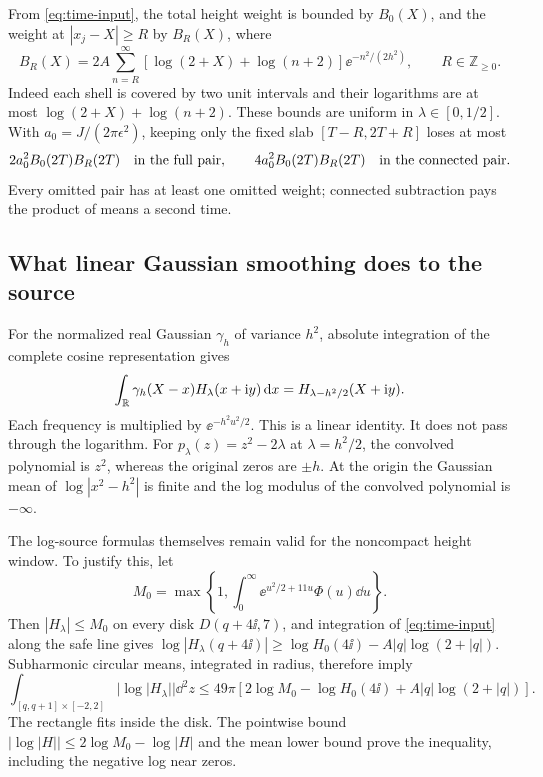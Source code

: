 From \eqref{eq:time-input}, the total height weight is bounded by
$B_0(X)$, and the weight at $|x_j-X|\ge R$ by $B_R(X)$, where
\begin{equation}\label{eq:gaussian-weight-tail}
 B_R(X)=2A\sum_{n=R}^\infty
       [\log(2+X)+\log(n+2)]\ee^{-n^2/(2h^2)},\qquad R\in\mathbb Z_{\ge0}.
\end{equation}
Indeed each shell is covered by two unit intervals and their logarithms
are at most $\log(2+X)+\log(n+2)$. These bounds are uniform in
$\lambda\in[0,1/2]$. With $a_0=J/(2\pi\epsilon^2)$, keeping only
the fixed slab $[T-R,2T+R]$ loses at most
\begin{equation}\label{eq:gaussian-pair-tail}
 2a_0^2B_0(2T)B_R(2T)\quad\hbox{in the full pair},\qquad
 4a_0^2B_0(2T)B_R(2T)\quad\hbox{in the connected pair}.
\end{equation}
Every omitted pair has at least one omitted weight; connected subtraction
pays the product of means a second time.

\subsection{What linear Gaussian smoothing does to the source}

For the normalized real Gaussian $\gamma_h$ of variance $h^2$,
absolute integration of the complete cosine representation gives
\begin{equation}\label{eq:source-heat-shift}
 \int_\mathbb R\gamma_h(X-x)H_\lambda(x+\mathrm i y)\,\mathrm d x
       =H_{\lambda-h^2/2}(X+\mathrm i y).
\end{equation}
Each frequency is multiplied by $\ee^{-h^2u^2/2}$.
This is a linear identity. It does not pass through the logarithm.
For $p_\lambda(z)=z^2-2\lambda$ at $\lambda=h^2/2$, the convolved
polynomial is $z^2$, whereas the original zeros are $\pm h$.
At the origin the Gaussian mean of $\log|x^2-h^2|$ is finite and
the log modulus of the convolved polynomial is $-\infty$.

The log-source formulas themselves remain valid for the noncompact
height window. To justify this, let
\[
 M_0=\max\left\{1,\int_0^\infty\ee^{u^2/2+11u}\Phi(u)\dd u\right\}.
\]
Then $|H_\lambda|\le M_0$ on every disk $D(q+4\ii,7)$, and
integration of \eqref{eq:time-input} along the safe line gives
$\log|H_\lambda(q+4\ii)|\ge\log H_0(4\ii)-A|q|\log(2+|q|)$.
Subharmonic circular means, integrated in radius, therefore imply
\begin{equation}\label{eq:noncompact-log-tail}
 \int_{[q,q+1]\times[-2,2]}|\log|H_\lambda||\dd^2z
 \le49\pi[2\log M_0-\log H_0(4\ii)+A|q|\log(2+|q|)].
\end{equation}
The rectangle fits inside the disk. The pointwise bound
$|\log|H||\le2\log M_0-\log|H|$ and the mean lower bound prove
the inequality, including the negative log near zeros.

